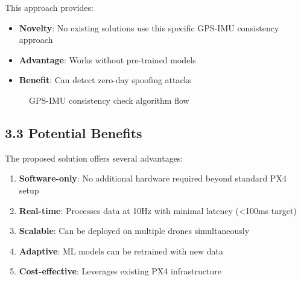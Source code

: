 This approach provides:

\begin{itemize}
    \item \textbf{Novelty}: No existing solutions use this specific GPS-IMU consistency approach
    \item \textbf{Advantage}: Works without pre-trained models
    \item \textbf{Benefit}: Can detect zero-day spoofing attacks
\end{itemize}

\begin{figure}[htbp]
    \centering
    \caption{GPS-IMU consistency check algorithm flow}
    \label{fig:gps_imu_flow}
\end{figure}

\subsection{3.3 Potential Benefits}

The proposed solution offers several advantages:

\begin{enumerate}
    \item \textbf{Software-only}: No additional hardware required beyond standard PX4 setup
    \item \textbf{Real-time}: Processes data at 10Hz with minimal latency (<100ms target)
    \item \textbf{Scalable}: Can be deployed on multiple drones simultaneously
    \item \textbf{Adaptive}: ML models can be retrained with new data
    \item \textbf{Cost-effective}: Leverages existing PX4 infrastructure
\end{enumerate}

